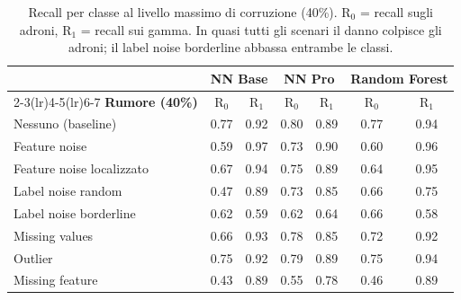 \begin{table}[H]\centering\small
\setlength{\tabcolsep}{5pt}
\caption{Recall per classe al livello massimo di corruzione (40\%). R$_0$ = recall sugli adroni, R$_1$ = recall sui gamma. In quasi tutti gli scenari il danno colpisce gli adroni; il label noise borderline abbassa entrambe le classi.}\label{tab:recallclassi}
\begin{tabular}{l cc cc cc}
\toprule
 & \multicolumn{2}{c}{NN Base} & \multicolumn{2}{c}{NN Pro} & \multicolumn{2}{c}{Random Forest}\\
\cmidrule(lr){2-3}\cmidrule(lr){4-5}\cmidrule(lr){6-7}
\textbf{Rumore (40\%)} & R$_0$ & R$_1$ & R$_0$ & R$_1$ & R$_0$ & R$_1$ \\
\midrule
Nessuno (baseline)       & 0.77 & 0.92 & 0.80 & 0.89 & 0.77 & 0.94 \\
\midrule
Feature noise            & 0.59 & 0.97 & 0.73 & 0.90 & 0.60 & 0.96 \\
Feature noise localizzato & 0.67 & 0.94 & 0.75 & 0.89 & 0.64 & 0.95 \\
Label noise random       & 0.47 & 0.89 & 0.73 & 0.85 & 0.66 & 0.75 \\
Label noise borderline   & 0.62 & 0.59 & 0.62 & 0.64 & 0.66 & 0.58 \\
Missing values           & 0.66 & 0.93 & 0.78 & 0.85 & 0.72 & 0.92 \\
Outlier                  & 0.75 & 0.92 & 0.79 & 0.89 & 0.75 & 0.94 \\
Missing feature          & 0.43 & 0.89 & 0.55 & 0.78 & 0.46 & 0.89 \\
\bottomrule
\end{tabular}
\end{table}
